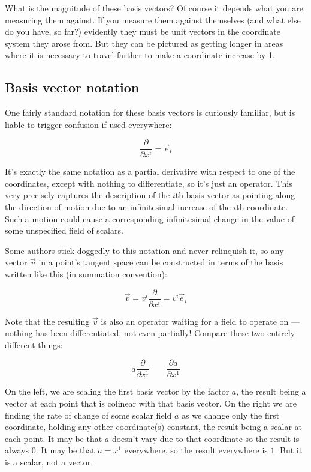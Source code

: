 What is the magnitude of these basis vectors? Of course it depends what you are measuring them against. If you measure them against themselves (and what else do you have, so far?) evidently they must be unit vectors in the coordinate system they arose from. But they can be pictured as getting longer in areas where it is necessary to travel farther to make a coordinate increase by 1.

\subsection{Basis vector notation}

One fairly standard notation for these basis vectors is curiously familiar, but is liable to trigger confusion if used everywhere:

$$
\frac{\partial}{\partial x^i} = \vec{e}_i
$$

It's exactly the same notation as a partial derivative with respect to one of the coordinates, except with nothing to differentiate, so it's just an operator. This very precisely captures the description of the $i$th basis vector as pointing along the direction of motion due to an infinitesimal increase of the $i$th coordinate. Such a motion could cause a corresponding infinitesimal change in the value of some unspecified field of scalars.

Some authors stick doggedly to this notation and never relinquish it, so any vector $\vec{v}$ in a point's tangent space can be constructed in terms of the basis written like this (in summation convention):

$$
\vec{v} 
= 
v^i \frac{\partial}{\partial x^i}
= 
v^i \vec{e}_i
$$

Note that the resulting $\vec{v}$ is also an operator waiting for a field to operate on --- nothing has been differentiated, not even partially! Compare these two entirely different things:

$$
a \frac{\partial}{\partial x^1}
\quad \quad
\frac{\partial a}{\partial x^1} 
$$

On the left, we are scaling the first basis vector by the factor $a$, the result being a vector at each point that is colinear with that basis vector. On the right we are finding the rate of change of some scalar field $a$ as we change only the first coordinate, holding any other coordinate(s) constant, the result being a scalar at each point. It may be that $a$ doesn't vary due to that coordinate so the result is always $0$. It may be that $a = x^1$ everywhere, so the result everywhere is $1$. But it is a scalar, not a vector.

